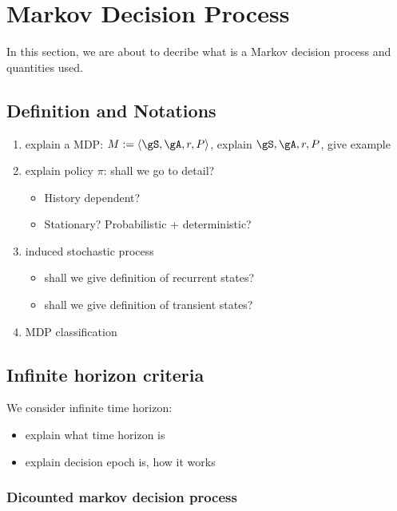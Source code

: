 
\chapter{Markov Decision Process}
\label{ch:mdp}


In this section, we are about to decribe what is a Markov decision process and quantities used.


\section{Definition and Notations}

\begin{enumerate}
    \item explain a MDP: $M:=\langle\gS, \gA, r, P\rangle$, explain $\gS, \gA, r, P$, give example
    \item explain policy $\pi$: shall we go to detail?
        \begin{itemize}
            \item History dependent?
            \item Stationary? Probabilistic + deterministic?
        \end{itemize}
    \item induced stochastic process
        \begin{itemize}
            \item shall we give definition of recurrent states?
            \item shall we give definition of transient states?
        \end{itemize}
    \item MDP classification
\end{enumerate}

\section{Infinite horizon criteria}

We consider infinite time horizon:
\begin{itemize}
    \item explain what time horizon is
    \item explain decision epoch is, how it works
\end{itemize}

\subsection{Dicounted markov decision process}

